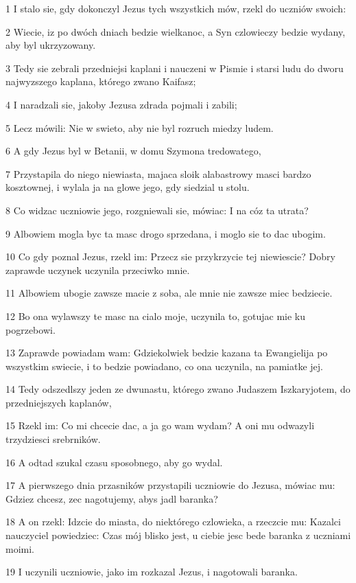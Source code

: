 \par 1 I stalo sie, gdy dokonczyl Jezus tych wszystkich mów, rzekl do uczniów swoich:
\par 2 Wiecie, iz po dwóch dniach bedzie wielkanoc, a Syn czlowieczy bedzie wydany, aby byl ukrzyzowany.
\par 3 Tedy sie zebrali przedniejsi kaplani i nauczeni w Pismie i starsi ludu do dworu najwyzszego kaplana, którego zwano Kaifasz;
\par 4 I naradzali sie, jakoby Jezusa zdrada pojmali i zabili;
\par 5 Lecz mówili: Nie w swieto, aby nie byl rozruch miedzy ludem.
\par 6 A gdy Jezus byl w Betanii, w domu Szymona tredowatego,
\par 7 Przystapila do niego niewiasta, majaca sloik alabastrowy masci bardzo kosztownej, i wylala ja na glowe jego, gdy siedzial u stolu.
\par 8 Co widzac uczniowie jego, rozgniewali sie, mówiac: I na cóz ta utrata?
\par 9 Albowiem mogla byc ta masc drogo sprzedana, i moglo sie to dac ubogim.
\par 10 Co gdy poznal Jezus, rzekl im: Przecz sie przykrzycie tej niewiescie? Dobry zaprawde uczynek uczynila przeciwko mnie.
\par 11 Albowiem ubogie zawsze macie z soba, ale mnie nie zawsze miec bedziecie.
\par 12 Bo ona wylawszy te masc na cialo moje, uczynila to, gotujac mie ku pogrzebowi.
\par 13 Zaprawde powiadam wam: Gdziekolwiek bedzie kazana ta Ewangielija po wszystkim swiecie, i to bedzie powiadano, co ona uczynila, na pamiatke jej.
\par 14 Tedy odszedlszy jeden ze dwunastu, którego zwano Judaszem Iszkaryjotem, do przedniejszych kaplanów,
\par 15 Rzekl im: Co mi chcecie dac, a ja go wam wydam? A oni mu odwazyli trzydziesci srebrników.
\par 16 A odtad szukal czasu sposobnego, aby go wydal.
\par 17 A pierwszego dnia przasników przystapili uczniowie do Jezusa, mówiac mu: Gdziez chcesz, zec nagotujemy, abys jadl baranka?
\par 18 A on rzekl: Idzcie do miasta, do niektórego czlowieka, a rzeczcie mu: Kazalci nauczyciel powiedziec: Czas mój blisko jest, u ciebie jesc bede baranka z uczniami moimi.
\par 19 I uczynili uczniowie, jako im rozkazal Jezus, i nagotowali baranka.
